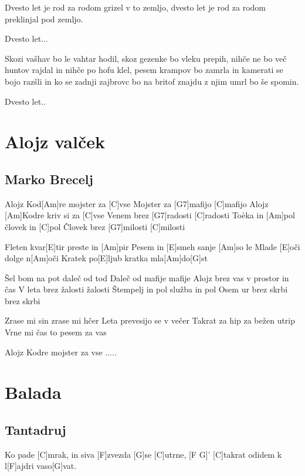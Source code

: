 \documentclass[a4paper,12pt]{article}
\begin{document}
\begin{multicols}{2}
\begin{guitar}
Dvesto let je rod za rodom grizel v to zemljo,
dvesto let je rod za rodom 
preklinjal pod zemljo.


Dvesto let...


Skozi vašhav bo le vahtar hodil,
skoz gezenke bo vleku prepih,
nihče ne bo več huntov rajdal
in nihče po hofu klel,
pesem krampov bo zamrla
in kamerati se bojo razšli
in ko se zadnji zajbrovc bo na britof znajdu
z njim umrl bo še spomin.


Dvesto let..
\end{guitar}
\section{Alojz valček}
\subsection*{Marko Brecelj}
\begin{guitar}
[C]Alojz Kod[Am]re mojster za [C]vse
Mojster za [G7]mafijo [C]mafijo
Alojz [Am]Kodre kriv si za [C]vse
Venem brez [G7]radosti [C]radosti
Toèka in [Am]pol človek in [C]pol
Človek brez [G7]milosti [C]milosti



Fleten kvar[E]tir preste in [Am]pir
Pesem in [E]smeh sanje [Am]so le
Mlade [E]oči dolge n[Am]oči
Kratek po[E]ljub kratka mla[Am]do[G]st



Šel bom na pot daleč od tod
Daleč od mafije mafije
Alojz brez vas v prostor in čas
V leta brez žalosti žalosti
Štempelj in pol služba in pol
Osem ur brez skrbi brez skrbi



Zrase mi sin zrase mi hčer
Leta prevesijo se v večer
Takrat za hip za bežen utrip
Vrne mi čas to pesem za vas



Alojz Kodre mojster za vse .....

\end{guitar}
\section{Balada}
\subsection*{Tantadruj}
\begin{guitar}
Ko pade [C]mrak, 
in siva [F]zvezda [G]se [C]utrne, [F G]'
[C]takrat odidem k l[F]ajdri vaso[G]vat. 


\end{guitar}
\end{multicols}
\end{document}
